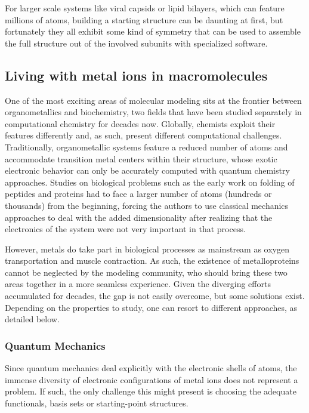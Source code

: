 For larger scale systems like viral capsids or lipid bilayers, which can feature millions of atoms, building a starting structure can be daunting at first, but fortunately they all exhibit some kind of symmetry that can be used to assemble the full structure out of the involved subunits with specialized software.\cite{bietz2016siena,sym}

\subsection{Living with metal ions in macromolecules}
One of the most exciting areas of molecular modeling sits at the frontier between organometallics and biochemistry, two fields that have been studied separately in computational chemistry for decades now. Globally, chemists exploit their features differently and, as such, present different computational challenges. Traditionally, organometallic systems feature a reduced number of atoms and accommodate transition metal centers within their structure, whose exotic electronic behavior can only be accurately computed with quantum chemistry approaches. Studies on biological problems such as the early work on folding of peptides and proteins had to face a larger number of atoms (hundreds or thousands) from the beginning, forcing the authors to use classical mechanics approaches to deal with the added dimensionality after realizing that the electronics of the system were not very important in that process.

However, metals do take part in biological processes as mainstream as oxygen transportation and muscle contraction. As such, the existence of metalloproteins cannot be neglected by the modeling community, who should bring these two areas together in a more seamless experience. Given the diverging efforts accumulated for decades, the gap is not easily overcome, but some solutions exist. Depending on the properties to study, one can resort to different approaches, as detailed below.

\subsubsection{Quantum Mechanics}
Since quantum mechanics deal explicitly with the electronic shells of atoms, the immense diversity of electronic configurations of metal ions does not represent a problem. If such, the only challenge this might present is choosing the adequate functionals, basis sets or starting-point structures.

